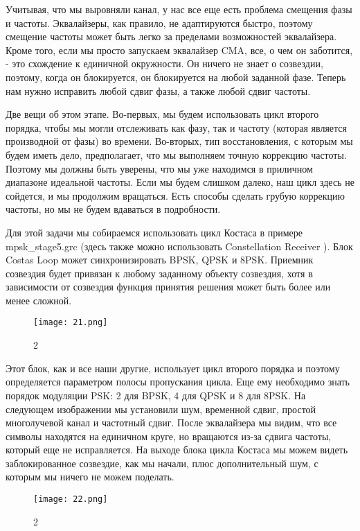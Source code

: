 \documentclass[10pt,a4paper,oneside]{article}
\begin{document}
Учитывая, что мы выровняли канал, у нас все еще есть проблема смещения фазы и частоты. Эквалайзеры, как правило, не адаптируются быстро, поэтому смещение частоты может быть легко за пределами возможностей эквалайзера. Кроме того, если мы просто запускаем эквалайзер CMA, все, о чем он заботится, - это схождение к единичной окружности. Он ничего не знает о созвездии, поэтому, когда он блокируется, он блокируется на любой заданной фазе. Теперь нам нужно исправить любой сдвиг фазы, а также любой сдвиг частоты.

Две вещи об этом этапе. Во-первых, мы будем использовать цикл второго порядка, чтобы мы могли отслеживать как фазу, так и частоту (которая является производной от фазы) во времени. Во-вторых, тип восстановления, с которым мы будем иметь дело, предполагает, что мы выполняем точную коррекцию частоты. Поэтому мы должны быть уверены, что мы уже находимся в приличном диапазоне идеальной частоты. Если мы будем слишком далеко, наш цикл здесь не сойдется, и мы продолжим вращаться. Есть способы сделать грубую коррекцию частоты, но мы не будем вдаваться в подробности.

Для этой задачи мы собираемся использовать цикл Костаса в примере mpsk_stage5.grc (здесь также можно использовать Constellation Receiver ). Блок Costas Loop может синхронизировать BPSK, QPSK и 8PSK. Приемник созвездия будет привязан к любому заданному объекту созвездия, хотя в зависимости от созвездия функция принятия решения может быть более или менее сложной.

\begin{figure}[H]
        \centering
        \texttt{[image: 21.png]}
        \caption{2}
        \label{fig:first}
\end{figure}

Этот блок, как и все наши другие, использует цикл второго порядка и поэтому определяется параметром полосы пропускания цикла. Еще ему необходимо знать порядок модуляции PSK: 2 для BPSK, 4 для QPSK и 8 для 8PSK. На следующем изображении мы установили шум, временной сдвиг, простой многолучевой канал и частотный сдвиг. После эквалайзера мы видим, что все символы находятся на единичном круге, но вращаются из-за сдвига частоты, который еще не исправляется. На выходе блока цикла Костаса мы можем видеть заблокированное созвездие, как мы начали, плюс дополнительный шум, с которым мы ничего не можем поделать.

\begin{figure}[H]
        \centering
        \texttt{[image: 22.png]}
        \caption{2}
        \label{fig:first}
\end{figure}
\end{document}
